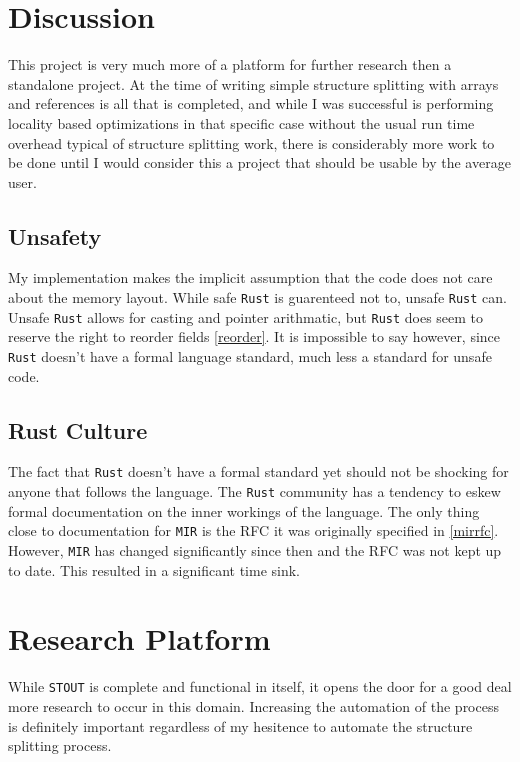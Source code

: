 \documentclass[prodmode,acmtecs]{acmsmall} %
\newcommand{\rustname}{{\texttt{Rust}}}
\def \rust {\rustname{}\xspace}
\newcommand{\mirname}{{\texttt{MIR}}}
\def \mir {\mirname{}\xspace}
\newcommand{\llvmname}{{\texttt{LLVM}}}
\def \llvm {\llvmname{}\xspace}
\newcommand{\projectname}{{\texttt{STOUT}}}
\def \name{\projectname\xspace}
\begin{document}
\section{Discussion}
\label{sec:discuss}

This project is very much more of a platform for further research then a
standalone project. At the time of writing simple structure splitting
with arrays and references is all that is completed, and 
while I was successful is performing locality based
optimizations in that specific case without the usual 
run time overhead typical of structure splitting
work, there is considerably more work to be done until I 
would consider this
a project that should be usable by the average user.

\todo[inline]{Maybe talk about why not \llvm }

\subsection{Unsafety}
\label{sec:unsafe}

My implementation makes the implicit assumption that the code
does not care about the memory layout. While safe 
\rust is guarenteed not to, unsafe \rust can. Unsafe \rust
allows for casting and pointer arithmatic, but \rust
does seem to reserve the right to reorder fields \ref{reorder}.
It is impossible to say however, since \rust doesn't have a
formal language standard, much less a standard for unsafe code.


\subsection{Rust Culture}
\label{sec:culture}

The fact that \rust doesn't have a formal standard yet should not be shocking
for anyone that follows the language. The \rust community has a tendency
to eskew formal documentation on the inner workings of the language.
The only thing close to documentation for \mir is the RFC it was originally
specified in \ref{mirrfc}. However, \mir has changed significantly since then 
and the RFC was not kept up to date. This resulted in a significant time
sink.

\section{Research Platform}

While \name is complete and functional in itself, it opens the door for 
a good deal more research to occur in this domain. Increasing the automation
of the process is definitely important regardless of my hesitence to automate
the structure splitting process. 
\end{document}

